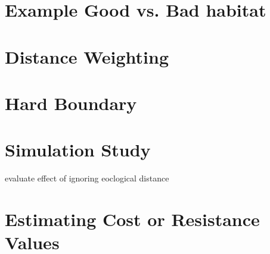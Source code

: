 \section{Example Good vs. Bad habitat}



\section{Distance Weighting}


\section{Hard Boundary}



\section{Simulation Study}

evaluate effect of ignoring eoclogical distance


\section{Estimating Cost or Resistance Values}




